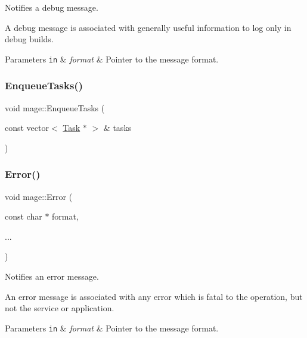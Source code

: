 Notifies a debug message.

A debug message is associated with generally useful information to log only in debug builds.


\begin{DoxyParams}[1]{Parameters}
\mbox{\tt in}  & {\em format} & Pointer to the message format. \\
\hline
\end{DoxyParams}
\hypertarget{namespacemage_a4d22783c8fe4d130a41b5ae001741df5}{}\label{namespacemage_a4d22783c8fe4d130a41b5ae001741df5} 
\subsubsection{\texorpdfstring{Enqueue\+Tasks()}{EnqueueTasks()}}
{\footnotesize\ttfamily void mage\+::\+Enqueue\+Tasks (\begin{DoxyParamCaption}\item[{const vector$<$ \hyperlink{classmage_1_1_task}{Task} $\ast$ $>$ \&}]{tasks }\end{DoxyParamCaption})}

\hypertarget{namespacemage_a52a7fe8c9ce39afd9e0b0299373db0fa}{}\label{namespacemage_a52a7fe8c9ce39afd9e0b0299373db0fa} 
\subsubsection{\texorpdfstring{Error()}{Error()}}
{\footnotesize\ttfamily void mage\+::\+Error (\begin{DoxyParamCaption}\item[{const char $\ast$}]{format,  }\item[{}]{... }\end{DoxyParamCaption})}

Notifies an error message.

An error message is associated with any error which is fatal to the operation, but not the service or application.


\begin{DoxyParams}[1]{Parameters}
\mbox{\tt in}  & {\em format} & Pointer to the message format. \\
\hline
\end{DoxyParams}
\hypertarget{namespacemage_aefd40c91591a8e0423e4222b4a5e6249}{}\label{namespacemage_aefd40c91591a8e0423e4222b4a5e6249} 
